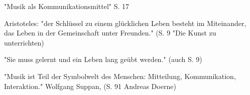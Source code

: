 "Musik als Kommunikationsmittel" S. 17

Aristoteles: "der Schlüssel zu einem glücklichen Leben besteht im Miteinander,
das Leben in der Gemeinschaft unter Freunden." (S. 9 "Die Kunst zu unterrichten)

"Sie muss gelernt und ein Leben lang geübt werden." (auch S. 9)


"Musik ist Teil der Symbolwelt des Menschen: Mitteilung, Kommunikation,
Interaktion." Wolfgang Suppan, (S. 91 Andreas Doerne)

